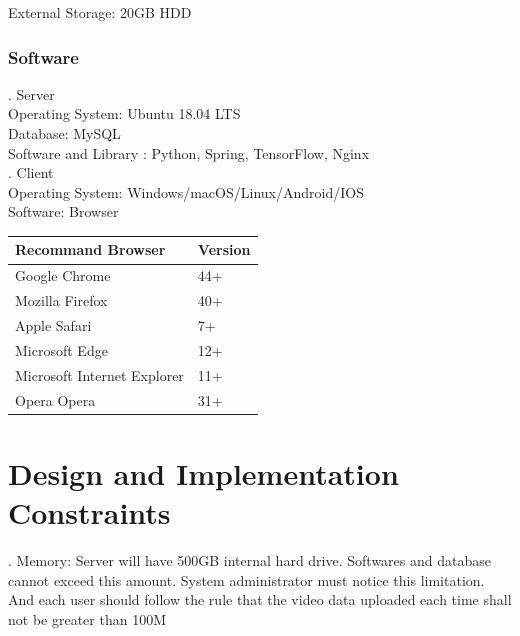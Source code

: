 \documentclass[16pt]{scrreprt}
\begin{document}
 
External Storage: 20GB HDD\\

 
\subsubsection{Software}

 
. Server\\

 
Operating System: Ubuntu 18.04 LTS\\

 
Database: MySQL\\

 
Software and Library : Python, Spring, TensorFlow, Nginx\\

 
. Client\\

 
Operating System: Windows/macOS/Linux/Android/IOS\\

 
Software: Browser\\

 
\begin{center}
    \begin{tabular}{p{7cm}p{7cm}}
        \hline
        Recommand Browser & Version\\
        \hline
        Google Chrome &  44+\\
        \hline
        Mozilla Firefox & 40+\\
        \hline
        Apple Safari & 7+\\
        \hline
        Microsoft Edge & 12+\\
        \hline
        Microsoft Internet Explorer & 11+\\
        \hline
        Opera Opera & 31+\\
        \hline

 
    \end{tabular}
\end{center}

 
\section{Design and Implementation Constraints}

 
. Memory: Server will have 500GB internal hard drive. Softwares and database cannot exceed this amount. System administrator must notice this limitation. And each user should follow the rule that the video data uploaded each time shall not be greater than 100M\\
\end{document}

